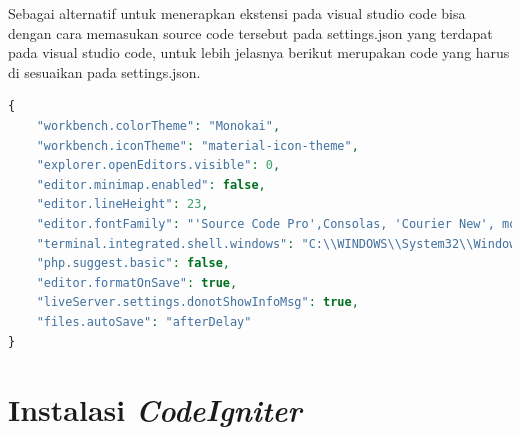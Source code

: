 \begin{enumerate}
Sebagai alternatif untuk menerapkan ekstensi pada visual studio code bisa dengan cara memasukan source code tersebut pada settings.json yang terdapat  pada visual studio code, untuk lebih jelasnya berikut merupakan code yang harus di sesuaikan pada settings.json.

\end{enumerate}
\begin{lstlisting}[language=php]
{
    "workbench.colorTheme": "Monokai",
    "workbench.iconTheme": "material-icon-theme",
    "explorer.openEditors.visible": 0,
    "editor.minimap.enabled": false,
    "editor.lineHeight": 23,
    "editor.fontFamily": "'Source Code Pro',Consolas, 'Courier New', monospace",
    "terminal.integrated.shell.windows": "C:\\WINDOWS\\System32\\WindowsPowerShell\\v1.0\\powershell.exe",
    "php.suggest.basic": false,
    "editor.formatOnSave": true,
    "liveServer.settings.donotShowInfoMsg": true,
    "files.autoSave": "afterDelay"
}
\end{lstlisting} 

\section{ Instalasi \textit{CodeIgniter}}

